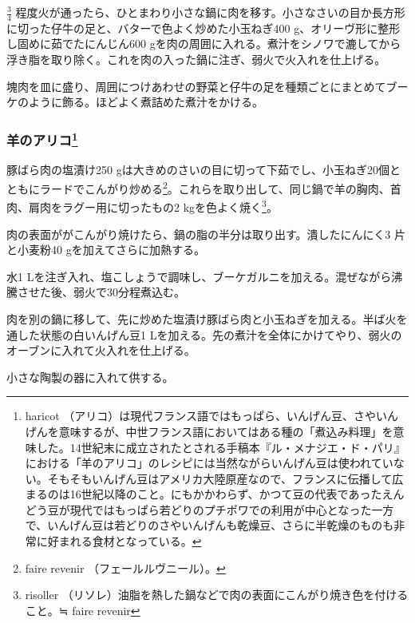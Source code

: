 \begin{recette}
\(\frac{3}{4}\)
程度火が通ったら、ひとまわり小さな鍋に肉を移す。小さなさいの目か長方形に切った仔牛の足と、バターで色よく炒めた小玉ねぎ400
g、オリーヴ形に整形し固めに茹でたにんじん600
gを肉の周囲に入れる。煮汁をシノワで漉してから浮き脂を取り除く。これを肉の入った鍋に注ぎ、弱火で火入れを仕上げる。

塊肉を皿に盛り、周囲につけあわせの野菜と仔牛の足を種類ごとにまとめてブーケのように飾る。ほどよく煮詰めた煮汁をかける。

\hypertarget{haricot-de-mouton}{%
\subsubsection[羊のアリコ]{\texorpdfstring{羊のアリコ\footnote{haricot
  （アリコ）は現代フランス語ではもっぱら、いんげん豆、さやいんげんを意味するが、中世フランス語においてはある種の「煮込み料理」を意味した。14世紀末に成立されたとされる手稿本『ル・メナジエ・ド・パリ』における「羊のアリコ」のレシピには当然ながらいんげん豆は使われていない。そもそもいんげん豆はアメリカ大陸原産なので、フランスに伝播して広まるのは16世紀以降のこと。にもかかわらず、かつて豆の代表であったえんどう豆が現代ではもっぱら若どりのプチポワでの利用が中心となった一方で、いんげん豆は若どりのさやいんげんも乾燥豆、さらに半乾燥のものも非常に好まれる食材となっている。}}{羊のアリコ}}\label{haricot-de-mouton}}



豚ばら肉の塩漬け250
gは大きめのさいの目に切って下茹でし、小玉ねぎ20個とともにラードでこんがり炒める\footnote{faire
  revenir （フェールルヴニール）。}。これらを取り出して、同じ鍋で羊の胸肉、首肉、肩肉をラグー用に切ったもの2
kgを色よく焼く\footnote{risoller
  （リソレ）油脂を熱した鍋などで肉の表面にこんがり焼き色を付けること。≒
  faire revenir}。

肉の表面ががこんがり焼けたら、鍋の脂の半分は取り出す。潰したにんにく3
片と小麦粉40 gを加えてさらに加熱する。

水1
Lを注ぎ入れ、塩こしょうで調味し、ブーケガルニを加える。混ぜながら沸騰させた後、弱火で30分程煮込む。

肉を別の鍋に移して、先に炒めた塩漬け豚ばら肉と小玉ねぎを加える。半ば火を通した状態の白いんげん豆1
Lを加える。先の煮汁を全体にかけてやり、弱火のオーブンに入れて火入れを仕上げる。

小さな陶製の器に入れて供する。


\end{recette}
